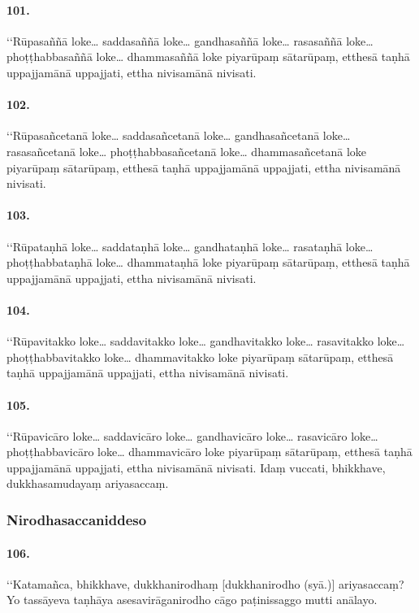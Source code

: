 \paragraph{101.} ‘‘Rūpasaññā loke… saddasaññā loke… gandhasaññā loke… rasasaññā loke… phoṭṭhabbasaññā loke… dhammasaññā loke piyarūpaṃ sātarūpaṃ, etthesā taṇhā uppajjamānā uppajjati, ettha nivisamānā nivisati.

\paragraph{102.} ‘‘Rūpasañcetanā loke… saddasañcetanā loke… gandhasañcetanā loke… rasasañcetanā loke… phoṭṭhabbasañcetanā loke… dhammasañcetanā loke piyarūpaṃ sātarūpaṃ, etthesā taṇhā uppajjamānā uppajjati, ettha nivisamānā nivisati.

\paragraph{103.} ‘‘Rūpataṇhā loke… saddataṇhā loke… gandhataṇhā loke… rasataṇhā loke… phoṭṭhabbataṇhā loke… dhammataṇhā loke piyarūpaṃ sātarūpaṃ, etthesā taṇhā uppajjamānā uppajjati, ettha nivisamānā nivisati.

\paragraph{104.} ‘‘Rūpavitakko loke… saddavitakko loke… gandhavitakko loke… rasavitakko loke… phoṭṭhabbavitakko loke… dhammavitakko loke piyarūpaṃ sātarūpaṃ, etthesā taṇhā uppajjamānā uppajjati, ettha nivisamānā nivisati.

\paragraph{105.} ‘‘Rūpavicāro loke… saddavicāro loke… gandhavicāro loke… rasavicāro loke… phoṭṭhabbavicāro loke… dhammavicāro loke piyarūpaṃ sātarūpaṃ, etthesā taṇhā uppajjamānā uppajjati, ettha nivisamānā nivisati. Idaṃ vuccati, bhikkhave, dukkhasamudayaṃ ariyasaccaṃ.

\subsubsection{Nirodhasaccaniddeso}

\paragraph{106.} ‘‘Katamañca, bhikkhave, dukkhanirodhaṃ [dukkhanirodho (syā.)] ariyasaccaṃ? Yo tassāyeva taṇhāya asesavirāganirodho cāgo paṭinissaggo mutti anālayo.


